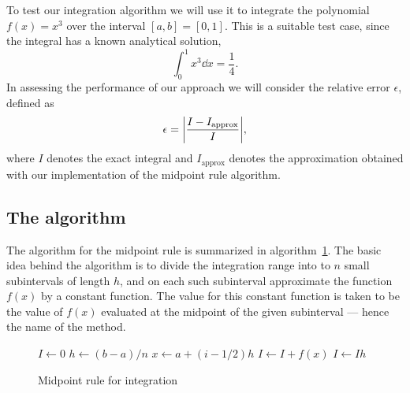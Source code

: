 \documentclass[english,notitlepage,reprint,nofootinbib]{revtex4-1}  %
\begin{document}
	To test our integration algorithm we will use it to integrate the polynomial $f(x) = x^3$ over the interval $[a,b] = [0,1]$. This is a suitable test case, since the integral has a known analytical solution,
	\begin{equation}
		\int_0^1 x^3 \dd x = \frac{1}{4}.
	\end{equation}
	In assessing the performance of our approach we will consider the relative error $\epsilon$, defined as
	\begin{equation}
		\epsilon = \abs{ \frac{I - I_{\text{approx}}}{I} },
	\end{equation}
	where $I$ denotes the exact integral and $I_\text{approx}$ denotes the approximation obtained with our implementation of the midpoint rule algorithm.
	
	
	\subsection*{The algorithm}
	The algorithm for the midpoint rule is summarized in algorithm~\ref{algo:midpointrule}. The basic idea behind the algorithm is to divide the integration range into to $n$ small subintervals of length $h$, and on each such subinterval approximate the function $f(x)$ by a constant function. The value for this constant function is taken to be the value of $f(x)$ evaluated at the midpoint of the given subinterval --- hence the name of the method.
	\begin{figure}
		\begin{algorithm}[H]
			\caption{Midpoint rule for integration}
			\label{algo:midpointrule}
			\begin{algorithmic}
				\State $I \leftarrow 0$        
				\State $h \leftarrow (b-a)/n$  
				\State $x \leftarrow a + (i-1/2)h$    %
				\State $I \leftarrow I + f(x)$   %
				\EndFor
				\State $I \leftarrow Ih$  
				\EndProcedure
			\end{algorithmic}
		\end{algorithm}
	\end{figure}
	
\end{document}
